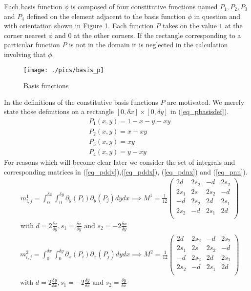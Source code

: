 \documentclass[11pt,fleqn]{article}
\theoremstyle{defstyle}
\begin{document}
Each basis function $\phi$ is composed of four constitutive functions named $P_1, P_2, P_3$ and $P_4$ defined on the element adjacent to the basis function $\phi$ in question and with orientation shown in Figure \ref{fig_pbasis}. Each function $P$ takes on the value $1$ at the corner nearest $\phi$ and $0$ at the other corners. If the rectangle corresponding to a particular function $P$ is not in the domain it is neglected in the calculation involving that $\phi$. 
\begin{figure}[H] 
\centering
\texttt{[image: ./pics/basis\_p]}
\caption{Basis functions} 
\label{fig_pbasis}
\end{figure}
In \cite{vrb} the definitions of the constitutive basis functions $P$ are motivated. We merely state those definitions on a rectangle $[0,\delta x] \times [0, \delta y]$ in (\ref{eq_pbasisdef}). 
\begin{equation}
\begin{aligned}
&P_1(x,y) = 1 -x-y-xy \\
&P_2(x,y) = x-xy \\
&P_3(x,y) = xy \\
&P_4(x,y) = y-xy 
\label{eq_pbasisdef}
\end{aligned}
\end{equation}  
For reasons which will become clear later we consider the set of integrals and corresponding matrices in (\ref{eq_pddy}),(\ref{eq_pddx}),  (\ref{eq_pdnx}) and (\ref{eq_pnn}).
\begin{equation}
\begin{aligned}
&m^1_{i,j} = \int_0^{\delta x} \int_0^{\delta y} \partial_y(P_i) \partial_y(P_j) dydx \implies
M^1 = \frac{1}{12}\begin{pmatrix}
2d & 2s_2 & -d & 2s_2 \\
2s_1 & 2s & 2s_2 & -d \\
-d & 2s_2 & 2d & 2s_1 \\
2s_2 & -d & 2s_1 & 2d \\
\end{pmatrix} \\
&\text{with } d = 2\frac{\delta x}{\delta y}, s_1 = \frac{\delta x}{\delta y} \text{ and } s_2 = -2\frac{\delta x}{\delta y}
\end{aligned}
\label{eq_pddy}
\end{equation}
\begin{equation}
\begin{aligned}
&m^2_{i,j} = \int_0^{\delta x} \int_0^{\delta y} \partial_x(P_i) \partial_x(P_j) dydx \implies
M^2 = \frac{1}{12}\begin{pmatrix}
2d & 2s_2 & -d & 2s_2 \\
2s_1 & 2s & 2s_2 & -d \\
-d & 2s_2 & 2d & 2s_1 \\
2s_2 & -d & 2s_1 & 2d \\
\end{pmatrix} \\
&\text{with } d = 2\frac{\delta y}{\delta x}, s_1 = -2\frac{\delta y}{\delta x} \text{ and } s_2 = \frac{\delta y}{\delta x}
\end{aligned}
\label{eq_pddx}
\end{equation}
\end{document}
